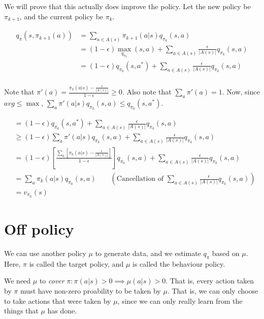 \documentclass[11pt]{book}
\newcommand{\pik}{{\pi_{k}}}
\newcommand{\piknext}{{\pi_{k+1}}}
\begin{document}
We will prove that this actually does improve the policy. Let the new policy
be $\piknext$, and the current policy be $\pik$.

\begin{align*}
q_\pi(s, \piknext(a)) &= \sum_{a \in A(s) } \piknext(a|s) q_{\pik}(s, a) \\
  &= (1- \epsilon) \max_{q_{\pik}}(s, a) + \sum_{a \in A(s)} \frac{\epsilon}{|A(s)|} q_{\pik}(s, a) \\
  &=  (1- \epsilon) q_{\pik}(s, a^*) + \sum_{a \in A(s)} \frac{\epsilon}{|A(s)|} q_{\pik}(s, a) \\
\end{align*}

Note that $\pi'(a) = \frac{ \pik(a|s) - \frac{\epsilon}{|A(s)|} }{1 - \epsilon} \geq 0$.
Also note that $\sum_a \pi'(a) = 1$. Now, since $avg \leq \max$, $\sum_a \pi'(a|s) q_\pik (s, a) \leq q_\pik(s, a^*)$.

\begin{align*}
  &=  (1- \epsilon) q_{\pik}(s, a^*) + \sum_{a \in A(s)} \frac{\epsilon}{|A(s)|} q_{\pik}(s, a) \\
  &\geq  (1- \epsilon) \sum_a \pi'(a|s) q_{\pik}(s, a) + 
         \sum_{a \in A(s)} \frac{\epsilon}{|A(s)|} q_{\pik}(s, a) \\
  &= (1- \epsilon) \left[ \frac{\sum_a \left[ \pik(a|s) - \frac{\epsilon}{|A(s)|} \right] }{1 - \epsilon} \right] q_{\pik}(s, a) + 
         \sum_{a \in A(s)} \frac{\epsilon}{|A(s)|} q_{\pik}(s, a) \\
  &= \sum_a \pik(a|s) q_\pik(s, a) \qquad \left( \text{Cancellation of $\sum_{a \in A(s)} \frac{\epsilon}{|A(s)|} q_{\pik}(s, a)$} \right) \\
  &= v_\pik(s)
\end{align*}


\section{Off policy}

We can use another policy $\mu$ to generate data, and we estimate $q_{\pi}$ based on $\mu$.
Here, $\pi$ is called the target policy, and $\mu$ is called the behaviour policy.

We need $\mu$ to \emph{cover} $\pi: \pi(a|s) > 0 \implies \mu(a|s) > 0$. That is, every action
taken by $\pi$ must have non-zero proability to be taken by $\mu$. That is, we can
only choose to take actions that were taken by $\mu$, since we can only really learn from the
things that $\mu$ has done.
\end{document}
